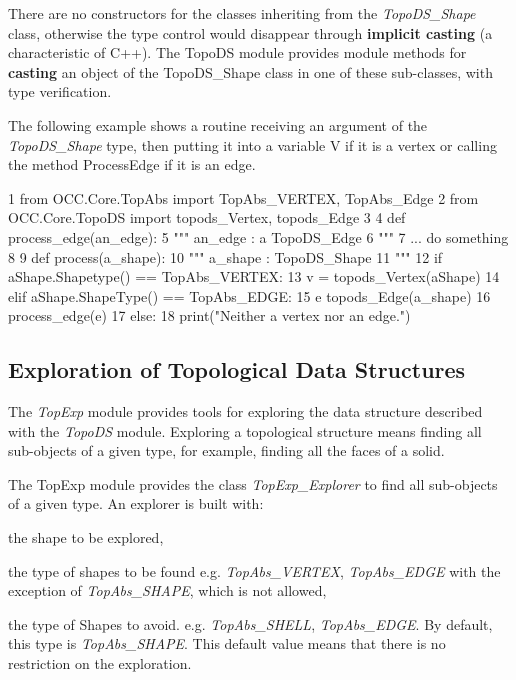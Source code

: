 There are no constructors for the classes inheriting from the {\itshape Topo\+D\+S\+\_\+\+Shape} class, otherwise the type control would disappear through {\bfseries implicit casting} (a characteristic of C++). The Topo\+DS module provides module methods for {\bfseries casting} an object of the Topo\+D\+S\+\_\+\+Shape class in one of these sub-\/classes, with type verification.

The following example shows a routine receiving an argument of the {\itshape Topo\+D\+S\+\_\+\+Shape} type, then putting it into a variable V if it is a vertex or calling the method Process\+Edge if it is an edge.


\begin{DoxyCode}
1 \textcolor{keyword}{from} OCC.Core.TopAbs \textcolor{keyword}{import} TopAbs\_VERTEX, TopAbs\_Edge
2 \textcolor{keyword}{from} OCC.Core.TopoDS \textcolor{keyword}{import} topods\_Vertex, topods\_Edge
3 
4 \textcolor{keyword}{def }process\_edge(an\_edge):
5   \textcolor{stringliteral}{""" an\_edge : a TopoDS\_Edge}
6 \textcolor{stringliteral}{  """}
7   ... do something 
8 
9 \textcolor{keyword}{def }process(a\_shape):
10   \textcolor{stringliteral}{""" a\_shape : TopoDS\_Shape}
11 \textcolor{stringliteral}{  """}  
12   \textcolor{keywordflow}{if} aShape.Shapetype() == TopAbs\_VERTEX:
13     v = topods\_Vertex(aShape)
14   \textcolor{keywordflow}{elif} aShape.ShapeType() == TopAbs\_EDGE:
15     e topods\_Edge(a\_shape)
16     process\_edge(e)
17   \textcolor{keywordflow}{else}:
18     print(\textcolor{stringliteral}{"Neither a vertex nor an edge."})
\end{DoxyCode}
\hypertarget{occt_user_guides__modeling_data_occt_modat_5_4}{}\subsection{Exploration of Topological Data Structures}\label{occt_user_guides__modeling_data_occt_modat_5_4}
The {\itshape Top\+Exp} module provides tools for exploring the data structure described with the {\itshape Topo\+DS} module. Exploring a topological structure means finding all sub-\/objects of a given type, for example, finding all the faces of a solid.

The Top\+Exp module provides the class {\itshape Top\+Exp\+\_\+\+Explorer} to find all sub-\/objects of a given type. An explorer is built with\+:
\begin{DoxyItemize}
\item the shape to be explored,
\item the type of shapes to be found e.\+g. {\itshape Top\+Abs\+\_\+\+V\+E\+R\+T\+EX}, {\itshape Top\+Abs\+\_\+\+E\+D\+GE} with the exception of {\itshape Top\+Abs\+\_\+\+S\+H\+A\+PE}, which is not allowed,
\item the type of Shapes to avoid. e.\+g. {\itshape Top\+Abs\+\_\+\+S\+H\+E\+LL}, {\itshape Top\+Abs\+\_\+\+E\+D\+GE}. By default, this type is {\itshape Top\+Abs\+\_\+\+S\+H\+A\+PE}. This default value means that there is no restriction on the exploration.
\end{DoxyItemize}

